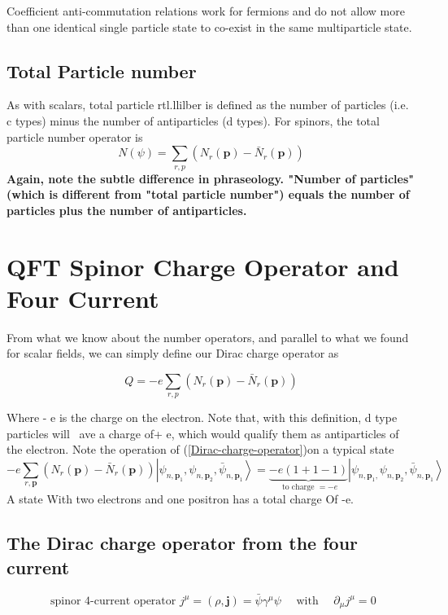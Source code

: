 Coefficient anti-commutation relations work for fermions and do not allow more than one identical single particle state to co-exist in the same multiparticle state.

\subsection{Total Particle number}
As with scalars, total particle rtl.llilber is defined as the number of particles (i.e. c types) minus the number of antiparticles (d types). For spinors, the total particle number operator is
\begin{equation}
N(\psi)=\sum_{r, p}\left(N_{r}(\mathbf{p})-\bar{N}_{r}(\mathbf{p})\right)
\end{equation}
\textbf{Again, note the subtle difference in phraseology. "Number of particles" (which is different from "total particle number") equals the number of particles plus the number of antiparticles.}

\section{QFT Spinor Charge Operator and Four Current}
From what we know about the number operators, and parallel to what we found for scalar fields, we can simply define our Dirac charge operator as
\begin{qt}
\begin{equation}
Q=-e \sum_{r, p}\left(N_{r}(\mathbf{p})-\bar{N}_{r}(\mathbf{p})\right)
\label{Dirac-charge-operator}
\end{equation}
\end{qt}
Where - e is the charge on the electron. Note that, with this definition, d type particles will ~ave a
charge of+ e, which would qualify them as antiparticles of the electron. Note the operation of
(\ref{Dirac-charge-operator})on a typical state
$$
-e \sum_{r, \mathbf{p}}\left(N_{r}(\mathbf{p})-\bar{N}_{r}(\mathbf{p})\right)\left|\psi_{n, \mathbf{p}_{1}}, \psi_{n, \mathbf{p}_{2}}, \bar{\psi}_{n, \mathbf{p}_{1}}\right\rangle=\underbrace{-e(1+1-1)}_{\text { to charge }=-e}\left|\psi_{n, \mathbf{p}_{1},} \psi_{n, \mathbf{p}_{2}}, \bar{\psi}_{n, \mathbf{p}_{1}}\right\rangle
$$
A state With two electrons and one positron has a total charge Of -e.
\subsection{The Dirac charge operator from the four current}
\begin{qt}
\begin{equation}
\text { spinor 4-current operator } j^{\mu}=(\rho, \mathbf{j})=\bar{\psi} \gamma^{\mu} \psi \quad \text { with } \quad \partial_{\mu} j^{\mu}=0
\end{equation}
\end{qt}

